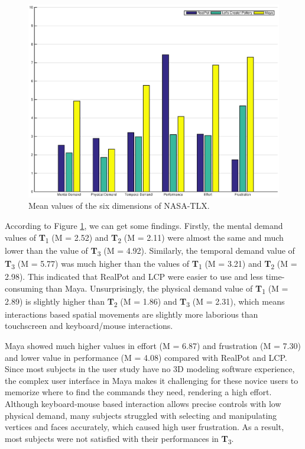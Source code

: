 \begin{figure}
	\includegraphics[width=\textwidth]{fig14.eps}
	\caption{Mean values of the six dimensions of NASA-TLX.}
	\label{fig:tlx}
\end{figure}

According to Figure \ref{fig:tlx}, we can get some findings. 
Firstly, the mental demand values of \textbf{T}\textsubscript{1} (M = 2.52) and \textbf{T}\textsubscript{2} (M = 2.11) were almost the same and much lower than the value of \textbf{T}\textsubscript{3} (M = 4.92). Similarly, the temporal demand value of \textbf{T}\textsubscript{3} (M = 5.77) was much higher than the values of \textbf{T}\textsubscript{1} (M = 3.21) and \textbf{T}\textsubscript{2} (M = 2.98). This indicated that RealPot and LCP were easier to use and less time-consuming than Maya. Unsurprisingly, the physical demand value of \textbf{T}\textsubscript{1} (M = 2.89) is slightly higher than \textbf{T}\textsubscript{2} (M = 1.86) and \textbf{T}\textsubscript{3} (M = 2.31), which means interactions based spatial movements are slightly more laborious than touchscreen and keyboard/mouse interactions.

Maya showed much higher values in effort (M = 6.87) and frustration (M = 7.30) and lower value in performance (M = 4.08) compared with RealPot and LCP.
Since most subjects in the user study have no 3D modeling software experience, the complex user interface in Maya makes it challenging for these novice users to memorize where to find the commands they need, rendering a high effort.
Although keyboard-mouse based interaction allows precise controls with low physical demand, many subjects struggled with selecting and manipulating vertices and faces accurately, which caused high user frustration. As a result, most subjects were not satisfied with their performances in \textbf{T}\textsubscript{3}.

